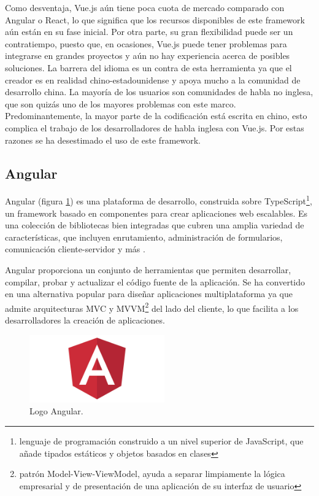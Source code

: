 Como desventaja, Vue.js a\'un tiene poca cuota de mercado comparado con Angular o React, lo que significa que los recursos disponibles de este framework a\'un est\'an en su fase inicial. Por otra parte, su gran flexibilidad puede ser un contratiempo, puesto que, en ocasiones, Vue.js puede tener problemas para integrarse en grandes proyectos y a\'un no hay experiencia acerca de posibles soluciones. La barrera del idioma es un contra de esta herramienta ya que el creador es en realidad chino-estadounidense y apoya mucho a la comunidad de desarrollo china. La mayor\'ia de los usuarios son comunidades de habla no inglesa, que son quiz\'as uno de los mayores problemas con este marco. Predominantemente, la mayor parte de la codificaci\'on est\'a escrita en chino, esto complica el trabajo de los desarrolladores de habla inglesa con Vue.js. Por estas razones se ha desestimado el uso de este framework.


\subsection{Angular}
Angular (figura \ref{angular}) es una plataforma de desarrollo, construida sobre TypeScript\footnote{lenguaje de programaci\'on construido a un nivel superior de JavaScript, que a\~nade tipados est\'aticos y objetos basados en clases}, un framework basado en componentes para crear aplicaciones web escalables. Es una colecci\'on de bibliotecas bien integradas que cubren una amplia variedad de caracter\'isticas, que incluyen enrutamiento, administraci\'on de formularios, comunicaci\'on cliente-servidor y m\'as \cite{angular}.

Angular proporciona un conjunto de herramientas que permiten desarrollar, compilar, probar y actualizar el c\'odigo fuente de la aplicaci\'on. Se ha convertido en una alternativa popular para dise\~nar aplicaciones multiplataforma ya que admite arquitecturas MVC y MVVM\footnote{patr\'on Model-View-ViewModel, ayuda a separar limpiamente la l\'ogica empresarial y de presentaci\'on de una aplicaci\'on de su interfaz de usuario} del lado del cliente, lo que facilita a los desarrolladores la creaci\'on de aplicaciones.

\begin{figure}
\vspace{-20pt}
\begin{center}
\includegraphics[width=0.52\textwidth]{images/angularLogo.png} 
\end{center} \vspace{-20pt} \caption{Logo Angular.}  \label{angular} \vspace{-10pt} 
\end{figure}

